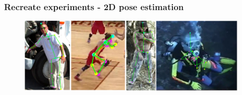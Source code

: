 \documentclass[9pt]{beamer}
\renewcommand{\caption}[1]{\\ \footnotesize{\captiongrey{#1}}}
\newenvironment{myframe}[1][]{%
\begin{frame}%
\frametitle{#1}
\setcounter{footnote}{0}


}{%
\end{frame}%
}
\begin{document}
\begin{myframe}[Recreate experiments - 2D pose estimation]
    \begin{figure}
        \includegraphics[width=.99\textwidth]{mpii_example_results.png}
        \centering
    \end{figure}    
\end{myframe}
\end{document}
